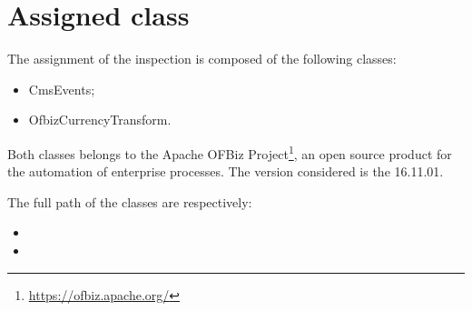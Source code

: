 \section{Assigned class}

The assignment of the inspection is composed of the following classes: 
\begin{itemize}
\item CmsEvents;
\item OfbizCurrencyTransform.
\end{itemize}

Both classes belongs to the Apache OFBiz Project\footnote{\url{https://ofbiz.apache.org/}}, an open source product for the automation of enterprise processes. The version considered is the 16.11.01.

The full path of the classes are respectively:

\begin{itemize}
\item {}
\item {}
\end{itemize}